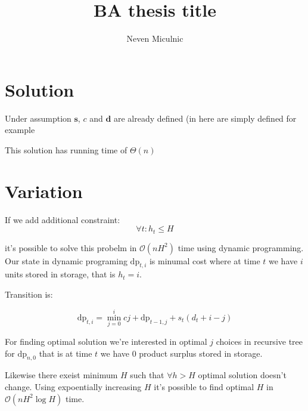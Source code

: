 \documentclass[
  oneside,
  12pt, a4paper,
  footinclude=true,
  headinclude=true,
  cleardoublepage=empty
]{scrbook}
\title{BA thesis title}
\author{Neven Miculnic}
\begin{document}
\maketitle




\section{Solution}
Under assumption $\mathbf{s}$, $c$ and $\mathbf{d}$ are already defined (in here are simply defined for example

This solution has running time of $\Theta(n)$

\section{Variation}
If we add additional constraint:
\[
    \forall t: h_t \le H
\]

it's possible to solve this probelm in $\mathcal{O}(nH^2)$ time using dynamic programming. Our state in dynamic programing $\mathrm{dp}_{t,i}$ is minumal cost where at time $t$ we have $i$ units stored in storage, that is $h_t = i$.

Transition is:

\[
    \mathrm{dp}_{t,i} = \min_{j=0}^{i}{
        cj
        + \mathrm{dp}_{t-1, j}
        + s_t \left( d_t + i - j \right) }
\]

For finding optimal solution we're interested in optimal $j$ choices in recursive tree for $\mathrm{dp}_{n, 0}$ that is at time $t$ we have 0 product surplus stored in storage.

Likewise there exeist minimum $H$ such that $\forall h > H$ optimal solution doesn't change. Using expoentially increasing $H$ it's possible to find optimal $H$ in $\mathcal{O}(nH^2\log H)$ time.
\end{document}
